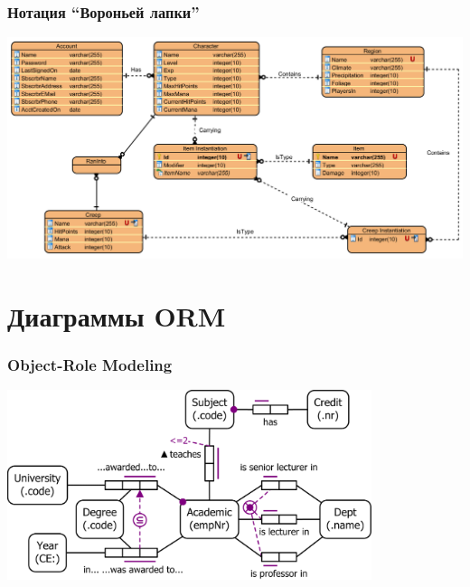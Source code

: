 \documentclass{../cscslides}
\begin{document}
    \begin{frame}
        \frametitle{Нотация ``Вороньей лапки''}
        \begin{center}
            \includegraphics[width=\textwidth]{erCrowsFoot.png}
        \end{center}
    \end{frame}

    \section{Диаграммы ORM}
    
    \begin{frame}
        \frametitle{Object-Role Modeling}
        \begin{center}
            \includegraphics[width=0.8\textwidth]{orm.png}
        \end{center}
    \end{frame}
\end{document}
